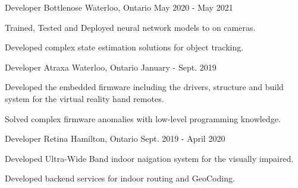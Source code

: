 
\begin{cventries}

  \cventry
    {Developer} %
    {Bottlenose} %
    {Waterloo, Ontario} %
    {May 2020 - May 2021} %
    {
      \begin{cvitems} %
        \item {Trained, Tested and Deployed neural network models to on cameras.}
        \item {Developed complex state estimation solutions for object tracking.}
      \end{cvitems}
    }

  \cventry
    {Developer} %
    {Atraxa} %
    {Waterloo, Ontario} %
    {January - Sept. 2019} %
    {
      \begin{cvitems} %
        \item {Developed the embedded firmware including the drivers, structure and build system for the virtual reality hand remotes.}
        \item {Solved complex firmware anomalies with low-level programming knowledge.}
      \end{cvitems}
    }

  \cventry
    {Developer} %
    {Retina} %
    {Hamilton, Ontario} %
    {Sept. 2019 - April 2020} %
    {
      \begin{cvitems} %
        \item {Developed Ultra-Wide Band indoor naigation system for the visually impaired.}
        \item {Developed backend services for indoor routing and GeoCoding.}
      \end{cvitems}
    }


\end{cventries}
